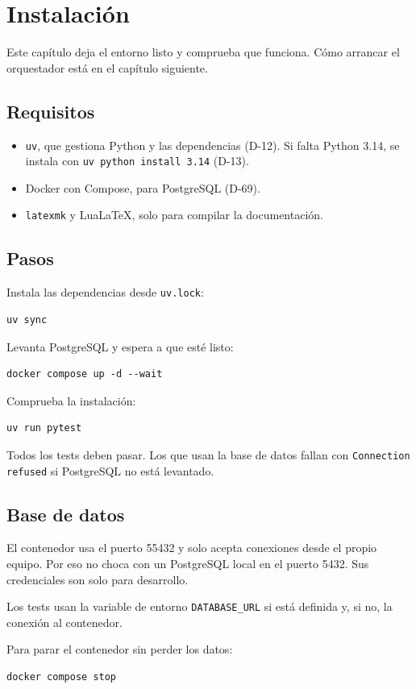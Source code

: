 \chapter{Instalación}

Este capítulo deja el entorno listo y comprueba que funciona. Cómo arrancar el orquestador está en el capítulo siguiente.

\section{Requisitos}

\begin{itemize}
  \item \texttt{uv}, que gestiona Python y las dependencias (D-12). Si falta Python 3.14, se instala con \texttt{uv python install 3.14} (D-13).
  \item Docker con Compose, para PostgreSQL (D-69).
  \item \texttt{latexmk} y LuaLaTeX, solo para compilar la documentación.
\end{itemize}

\section{Pasos}

Instala las dependencias desde \texttt{uv.lock}:

\begin{verbatim}
uv sync
\end{verbatim}

Levanta PostgreSQL y espera a que esté listo:

\begin{verbatim}
docker compose up -d --wait
\end{verbatim}

Comprueba la instalación:

\begin{verbatim}
uv run pytest
\end{verbatim}

Todos los tests deben pasar. Los que usan la base de datos fallan con \texttt{Connection refused} si PostgreSQL no está levantado.

\section{Base de datos}

El contenedor usa el puerto 55432 y solo acepta conexiones desde el propio equipo. Por eso no choca con un PostgreSQL local en el puerto 5432. Sus credenciales son solo para desarrollo.

Los tests usan la variable de entorno \texttt{DATABASE\_URL} si está definida y, si no, la conexión al contenedor.

Para parar el contenedor sin perder los datos:

\begin{verbatim}
docker compose stop
\end{verbatim}
